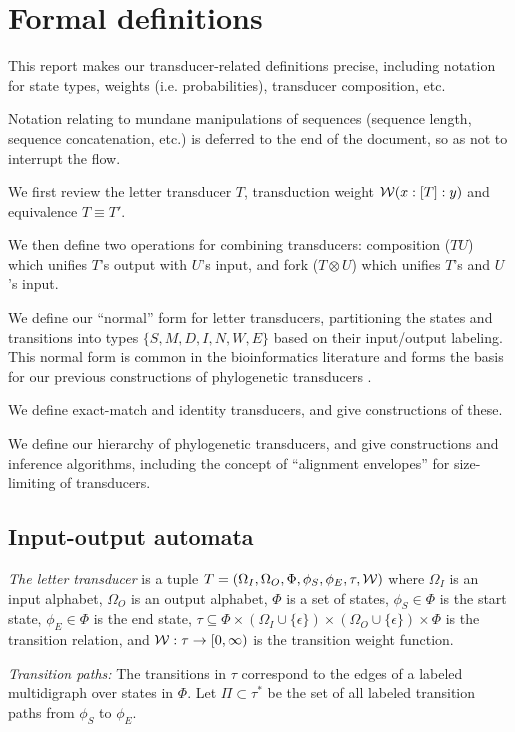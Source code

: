 \documentclass{article}
\newcommand\gappedalphabet[1]{(\Omega_{#1} \cup \{\epsilon\})}
\newcommand\wtrans[4]{#1(#2 : [#3] : #4)}
\newcommand\transequiv{\equiv}
\newcommand\compose{}
\newcommand\fork{\otimes}
\newcommand\States{\Phi}
\newcommand\Transitions{\tau}
\newcommand\startstate{\phi_S}
\newcommand\laststate{\phi_E}
\newcommand\weight{{\cal W}}
\begin{document}
\section{Formal definitions}
This report makes our transducer-related definitions precise,
 including notation for state types, weights (i.e. probabilities),
 transducer composition, etc.

Notation relating to mundane manipulations of sequences (sequence length, sequence concatenation, etc.) is deferred to the end of the document,
 so as not to interrupt the flow.

We first review the letter transducer $T$,
 transduction weight $\wtrans{\weight}{x}{T}{y}$ and
 equivalence $T \transequiv T'$.

We then define two operations for combining transducers:
 composition ($T \compose U$) which unifies $T$'s output with $U$'s input,
and
 fork ($T \fork U$) which unifies $T$'s and $U$'s input.

We define our ``normal'' form for letter transducers,
 partitioning the states and transitions into types $\{S,M,D,I,N,W,E\}$ based on their input/output labeling.
This normal form is common in the bioinformatics literature \cite{Durbin98}
 and forms the basis for our previous constructions of phylogenetic transducers \cite{Holmes2003,BradleyHolmes2009}.

We define exact-match and identity transducers, and give constructions of these.

We define our hierarchy of phylogenetic transducers, and give constructions and inference algorithms,
including the concept of ``alignment envelopes'' for size-limiting of transducers.

\subsection{Input-output automata}
{\em The letter transducer} is a tuple $T = (\Omega_I, \Omega_O, \States, \startstate, \laststate, \Transitions, \weight)$
where
 $\Omega_I$ is an input alphabet,
 $\Omega_O$ is an output alphabet,
$\States$ is a set of states,
$\startstate \in \States$ is the start state,
$\laststate \in \States$ is the end state,
$\Transitions \subseteq \States \times \gappedalphabet{I} \times \gappedalphabet{O} \times \States$ is the transition relation, and
$\weight:\Transitions \to [0,\infty)$ is the transition weight function.

{\em Transition paths:}
The transitions in $\Transitions$ correspond to the edges of a labeled multidigraph over states in $\States$.
Let $\Pi \subset \Transitions^\ast$ be the set of all labeled transition paths from $\startstate$ to $\laststate$.
\end{document}
